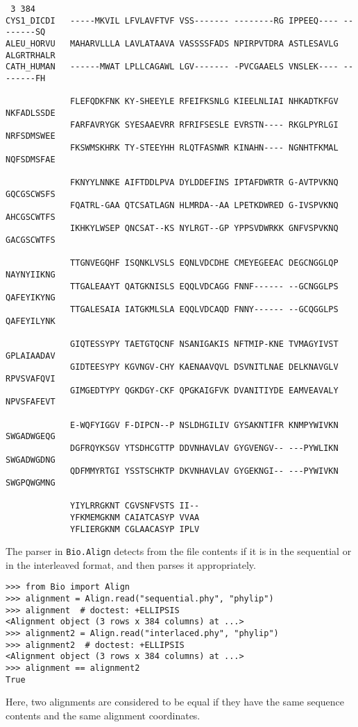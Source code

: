 \begin{verbatim}
 3 384
CYS1_DICDI   -----MKVIL LFVLAVFTVF VSS------- --------RG IPPEEQ---- --------SQ 
ALEU_HORVU   MAHARVLLLA LAVLATAAVA VASSSSFADS NPIRPVTDRA ASTLESAVLG ALGRTRHALR 
CATH_HUMAN   ------MWAT LPLLCAGAWL LGV------- -PVCGAAELS VNSLEK---- --------FH 

             FLEFQDKFNK KY-SHEEYLE RFEIFKSNLG KIEELNLIAI NHKADTKFGV NKFADLSSDE 
             FARFAVRYGK SYESAAEVRR RFRIFSESLE EVRSTN---- RKGLPYRLGI NRFSDMSWEE 
             FKSWMSKHRK TY-STEEYHH RLQTFASNWR KINAHN---- NGNHTFKMAL NQFSDMSFAE 

             FKNYYLNNKE AIFTDDLPVA DYLDDEFINS IPTAFDWRTR G-AVTPVKNQ GQCGSCWSFS 
             FQATRL-GAA QTCSATLAGN HLMRDA--AA LPETKDWRED G-IVSPVKNQ AHCGSCWTFS 
             IKHKYLWSEP QNCSAT--KS NYLRGT--GP YPPSVDWRKK GNFVSPVKNQ GACGSCWTFS 

             TTGNVEGQHF ISQNKLVSLS EQNLVDCDHE CMEYEGEEAC DEGCNGGLQP NAYNYIIKNG 
             TTGALEAAYT QATGKNISLS EQQLVDCAGG FNNF------ --GCNGGLPS QAFEYIKYNG 
             TTGALESAIA IATGKMLSLA EQQLVDCAQD FNNY------ --GCQGGLPS QAFEYILYNK 

             GIQTESSYPY TAETGTQCNF NSANIGAKIS NFTMIP-KNE TVMAGYIVST GPLAIAADAV 
             GIDTEESYPY KGVNGV-CHY KAENAAVQVL DSVNITLNAE DELKNAVGLV RPVSVAFQVI 
             GIMGEDTYPY QGKDGY-CKF QPGKAIGFVK DVANITIYDE EAMVEAVALY NPVSFAFEVT 

             E-WQFYIGGV F-DIPCN--P NSLDHGILIV GYSAKNTIFR KNMPYWIVKN SWGADWGEQG 
             DGFRQYKSGV YTSDHCGTTP DDVNHAVLAV GYGVENGV-- ---PYWLIKN SWGADWGDNG 
             QDFMMYRTGI YSSTSCHKTP DKVNHAVLAV GYGEKNGI-- ---PYWIVKN SWGPQWGMNG 

             YIYLRRGKNT CGVSNFVSTS II-- 
             YFKMEMGKNM CAIATCASYP VVAA 
             YFLIERGKNM CGLAACASYP IPLV
\end{verbatim}
The parser in \verb|Bio.Align| detects from the file contents if it is in the sequential or in the interleaved format, and then parses it appropriately.
\begin{verbatim}
>>> from Bio import Align
>>> alignment = Align.read("sequential.phy", "phylip")
>>> alignment  # doctest: +ELLIPSIS
<Alignment object (3 rows x 384 columns) at ...>
>>> alignment2 = Align.read("interlaced.phy", "phylip")
>>> alignment2  # doctest: +ELLIPSIS
<Alignment object (3 rows x 384 columns) at ...>
>>> alignment == alignment2
True
\end{verbatim}
Here, two alignments are considered to be equal if they have the same sequence contents and the same alignment coordinates.
